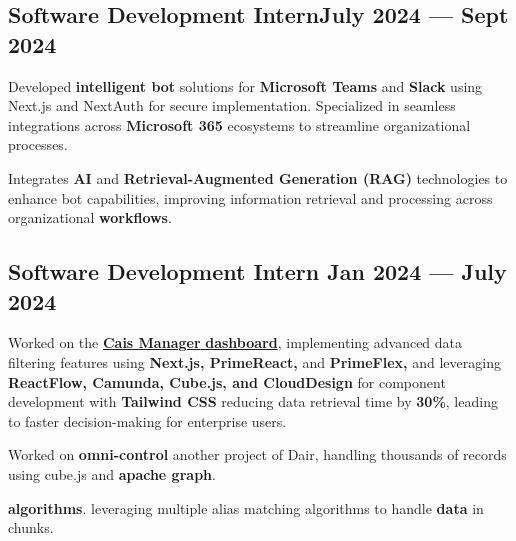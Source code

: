 \subsection{{Software Development Intern\hfill July 2024 --- Sept 2024}}
\begin{zitemize}
\item Developed \textbf{intelligent bot} solutions for \textbf{Microsoft Teams} and \textbf{Slack} using Next.js and NextAuth for secure implementation. Specialized in seamless integrations across \textbf{Microsoft 365} ecosystems to streamline organizational processes.
\item Integrates \textbf{AI} and \textbf{Retrieval-Augmented Generation (RAG)} technologies to enhance bot capabilities, improving information retrieval and processing across organizational \textbf{workflows}.
\end{zitemize}

\subsection{{\textbf{Software Development Intern }\hfill Jan 2024 --- July 2024}}
\begin{zitemize}
\item Worked on the \href{https://cais.dair.cloud/login}{\textbf{Cais Manager}\textbf{ dashboard}}, implementing advanced data filtering features using\textbf{ Next.js, PrimeReact, }and
\textbf{PrimeFlex, }and leveraging\textbf{ ReactFlow, Camunda, Cube.js, and CloudDesign }for component development with\textbf{ Tailwind CSS } reducing data retrieval time by \textbf{30\%}, leading to faster decision-making for enterprise users.
\item Worked on \textbf{omni-control} another project of Dair, handling thousands of records using cube.js and \textbf{apache graph}.
\item \textbf{algorithms}. leveraging multiple alias matching algorithms to handle \textbf{data} in chunks.
\end{zitemize}

